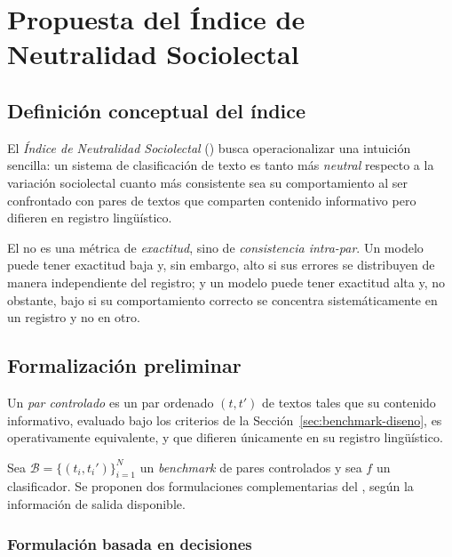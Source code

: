 \chapter{Propuesta del Índice de Neutralidad Sociolectal}
\label{cap:ins}

\section{Definición conceptual del índice}
\label{sec:ins-conceptual}

El \emph{Índice de Neutralidad Sociolectal} (\INS) busca operacionalizar una
intuición sencilla: un sistema de clasificación de texto es tanto más
\emph{neutral} respecto a la variación sociolectal cuanto más consistente sea
su comportamiento al ser confrontado con pares de textos que comparten
contenido informativo pero difieren en registro lingüístico.

El \INS no es una métrica de \emph{exactitud}, sino de \emph{consistencia
intra-par}. Un modelo puede tener exactitud baja y, sin embargo, \INS alto si
sus errores se distribuyen de manera independiente del registro; y un modelo
puede tener exactitud alta y, no obstante, \INS bajo si su comportamiento
correcto se concentra sistemáticamente en un registro y no en otro.

\section{Formalización preliminar}
\label{sec:ins-formal}

\begin{definicion}
\label{def:par-controlado}
Un \emph{par controlado} es un par ordenado $(t, t')$ de textos tales que su
contenido informativo, evaluado bajo los criterios de la
Sección~\ref{sec:benchmark-diseno}, es operativamente equivalente, y que
difieren únicamente en su registro lingüístico.
\end{definicion}

Sea $\mathcal{B} = \{(t_i, t_i')\}_{i=1}^{N}$ un \emph{benchmark} de pares
controlados y sea $f$ un clasificador. Se proponen dos formulaciones
complementarias del \INS, según la información de salida disponible.

\subsection{Formulación basada en decisiones}

